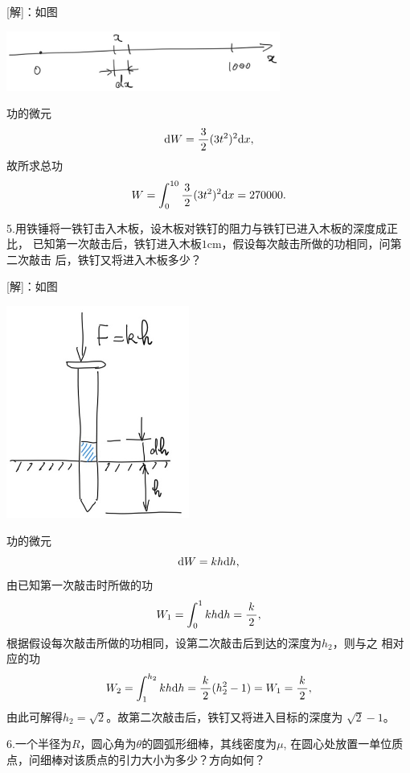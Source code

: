 [解]：如图
\begin{center}
	\includegraphics[width=9cm]{./images/ch6/moveSt.jpg}
\end{center}
功的微元
$$\mathrm{d} W=\displaystyle\frac{\,{3}\,}{\,{2}\,}(3t^2)^2\mathrm{d} x,$$
故所求总功
$$W=\displaystyle\int_0^{10}\displaystyle\frac{\,{3}\,}{\,{2}\,}(3t^2)^2\mathrm{d} x=270000.$$
\fin

5.用铁锤将一铁钉击入木板，设木板对铁钉的阻力与铁钉已进入木板的深度成正比，
已知第一次敲击后，铁钉进入木板$1$cm，假设每次敲击所做的功相同，问第二次敲击
后，铁钉又将进入木板多少？

[解]：如图
\begin{center}
	\includegraphics[width=6cm]{./images/ch6/nailSt.jpg}
\end{center}
功的微元
$$\mathrm{d} W=kh\mathrm{d} h,$$
由已知第一次敲击时所做的功
$$W_1=\displaystyle\int_0^1kh\mathrm{d} h=\displaystyle\frac{\,{k}\,}{\,{2}\,},$$
根据假设每次敲击所做的功相同，设第二次敲击后到达的深度为$h_2$，则与之
相对应的功
$$W_2=\displaystyle\int_1^{h_2}kh\mathrm{d} h=\displaystyle\frac{\,{k}\,}{\,{2}\,}(h^2_2-1)=W_1=\displaystyle\frac{\,{k}\,}{\,{2}\,},$$
由此可解得$h_2=\sqrt2$。故第二次敲击后，铁钉又将进入目标的深度为
$\sqrt2-1$。\fin

\bs

6.一个半径为$R$，圆心角为$\theta$的圆弧形细棒，其线密度为$\mu$,
在圆心处放置一单位质点，问细棒对该质点的引力大小为多少？方向如何？

